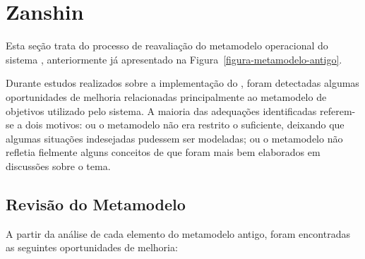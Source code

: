 
\chapter{Zanshin}
\label{sec-zanshin}

Esta seção trata do processo de reavaliação do metamodelo operacional do sistema \zanshin, anteriormente já apresentado na Figura~\ref{figura-metamodelo-antigo}.


Durante estudos realizados sobre a implementação do \framework \zanshin, foram detectadas algumas oportunidades de melhoria relacionadas principalmente ao metamodelo de objetivos utilizado pelo sistema. A maioria das adequações identificadas referem-se a dois motivos: ou o metamodelo não era restrito o suficiente, deixando que algumas situações indesejadas pudessem ser modeladas; ou o metamodelo não refletia fielmente alguns conceitos de \gore que foram mais bem elaborados em discussões sobre o tema. 



\section{Revisão do Metamodelo}
\label{sec-zanshin-revisao}
A partir da análise de cada elemento do metamodelo antigo, foram encontradas as seguintes oportunidades de melhoria:

